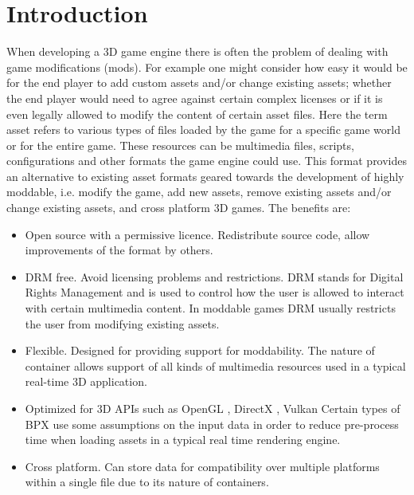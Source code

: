 \section{Introduction}
When developing a 3D game engine there is often the problem of dealing with game modifications (mods). For example one might consider how easy it would be for the end player to add custom assets and/or change existing assets; whether the end player would need to agree against certain complex licenses or if it is even legally allowed to modify the content of certain asset files.\newline
Here the term asset refers to various types of files loaded by the game for a specific game world or for the entire game. These resources can be multimedia files, scripts, configurations and other formats the game engine could use.\newline
This format provides an alternative to existing asset formats geared towards the development of highly moddable, i.e. modify the game, add new assets, remove existing assets and/or change existing assets, and cross platform 3D games.\newline
The benefits are:
\begin{itemize}
    \item Open source with a permissive licence.\newline
    Redistribute source code, allow improvements of the format by others.
    \item DRM \cite{DRM} free.\newline
    Avoid licensing problems and restrictions. DRM stands for Digital Rights Management and is used to control how the user is allowed to interact with certain multimedia content. In moddable games DRM usually restricts the user from modifying existing assets.
    \item Flexible.\newline
    Designed for providing support for moddability. The nature of container allows support of all kinds of multimedia resources used in a typical real-time 3D application.
    \item Optimized for 3D APIs such as OpenGL \cite{OpenGL}, DirectX \cite{DirectX}, Vulkan \cite{Vulkan}\newline
    Certain types of BPX use some assumptions on the input data in order to reduce pre-process time when loading assets in a typical real time rendering engine.
    \item Cross platform.\newline
    Can store data for compatibility over multiple platforms within a single file due to its nature of containers.
\end{itemize}
